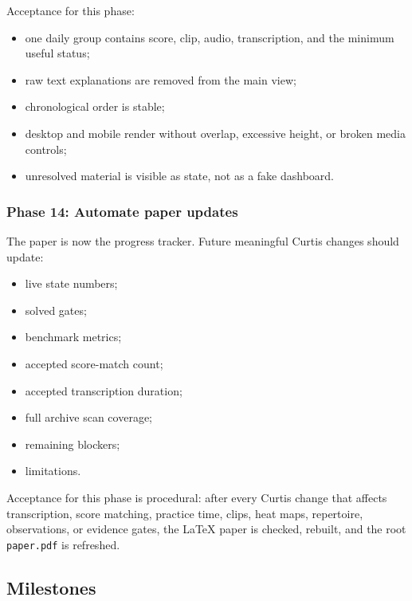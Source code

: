Acceptance for this phase:
\begin{itemize}
    \item one daily group contains score, clip, audio, transcription, and the minimum useful status;
    \item raw text explanations are removed from the main view;
    \item chronological order is stable;
    \item desktop and mobile render without overlap, excessive height, or broken media controls;
    \item unresolved material is visible as state, not as a fake dashboard.
\end{itemize}

\subsubsection*{Phase 14: Automate paper updates}

The paper is now the progress tracker. Future meaningful Curtis changes should update:
\begin{itemize}
    \item live state numbers;
    \item solved gates;
    \item benchmark metrics;
    \item accepted score-match count;
    \item accepted transcription duration;
    \item full archive scan coverage;
    \item remaining blockers;
    \item limitations.
\end{itemize}

Acceptance for this phase is procedural: after every Curtis change that affects transcription, score matching, practice time, clips, heat maps, repertoire, observations, or evidence gates, the LaTeX paper is checked, rebuilt, and the root \texttt{paper.pdf} is refreshed.

\subsection{Milestones}

